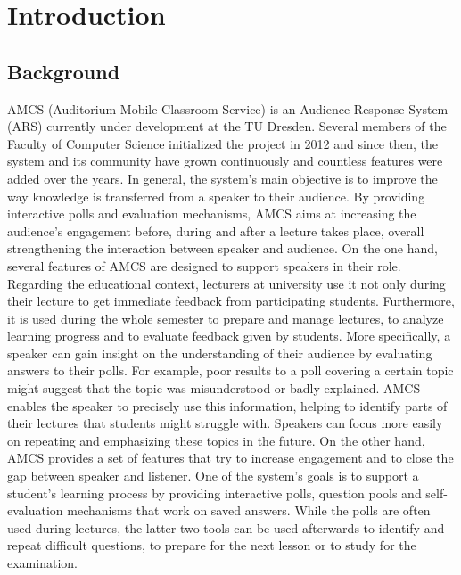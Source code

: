 
\chapter{Introduction}

\section{Background}

AMCS (Auditorium Mobile Classroom Service) is an Audience Response System (ARS) currently under development at the TU Dresden. Several members of the Faculty of Computer Science initialized the project in 2012 and since then, the system and its community have grown continuously and countless features were added over the years.
\newline
\newline
In general, the system's main objective is to improve the way knowledge is transferred from a speaker to their audience. By providing interactive polls and evaluation mechanisms, AMCS aims at increasing the audience's engagement before, during and after a lecture takes place, overall strengthening the interaction between speaker and audience.
\newline
\newline
On the one hand, several features of AMCS are designed to support speakers in their role. Regarding the educational context, lecturers at university use it not only during their lecture to get immediate feedback from participating students. Furthermore, it is used during the whole semester to prepare and manage lectures, to analyze learning progress and to evaluate feedback given by students. More specifically, a speaker can gain insight on the understanding of their audience by evaluating answers to their polls. For example, poor results to a poll covering a certain topic might suggest that the topic was misunderstood or badly explained. AMCS enables the speaker to precisely use  this information, helping to identify parts of their lectures that students might struggle with. Speakers can focus more easily on repeating and emphasizing these topics in the future.
\newline
\newline
On the other hand, AMCS provides a set of features that try to increase engagement and to close the gap between speaker and listener.
One of the system's goals is to support a student's learning process by providing interactive polls, question pools and self-evaluation mechanisms that work on saved answers. While the polls are often used during lectures, the latter two tools can be used afterwards to identify and repeat difficult questions, to prepare for the next lesson or to study for the examination. 
\newline
\newline
